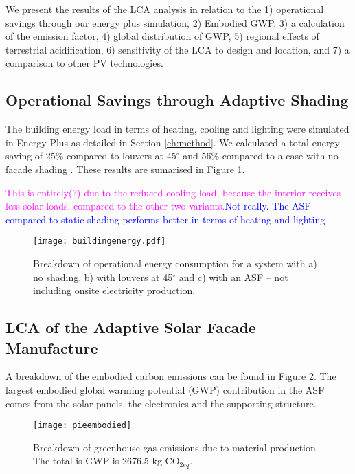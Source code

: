 
We present the results of the LCA analysis in relation to the 1) operational savings through our energy plus simulation, 2) Embodied GWP, 3) a calculation of the emission factor, 4) global distribution of GWP, 5) regional effects of terrestrial acidification, 6) sensitivity of the LCA to design and location, and 7) a comparison to other PV technologies.

\subsection{Operational Savings through Adaptive Shading}
\label{ch:oppResults}

The building energy load in terms of heating, cooling and lighting were simulated in Energy Plus as detailed in Section \ref{ch:method}. We calculated a total energy saving of 25\% compared to louvers at 45$^\circ$ and 56\% compared to a case with no facade shading \cite{jayathissa2015abs}. These results are sumarised in Figure \ref{fig:operational}. 

\textcolor{magenta}{This is entirely(?) due to the reduced cooling load, because the interior receives less solar loads, compared to the other two variants.}\textcolor{blue}{Not really. The ASF compared to static shading performs better in terms of heating and lighting}

\begin{figure}[H]
\begin{center}
\texttt{[image: buildingenergy.pdf]}
\caption{Breakdown of operational energy consumption for a system with a) no shading, b) with louvers at 45$^\circ$ and c) with an ASF -- not including onsite electricity production.}
\label{fig:operational}
\end{center}
\end{figure}

\subsection{LCA of the Adaptive Solar Facade Manufacture}

A breakdown of the embodied carbon emissions can be found in Figure  \ref{fig:embodied}. The largest embodied global warming potential (GWP) contribution in the ASF comes from the solar panels, the electronics and the supporting structure.

\begin{figure}[H]
\begin{center}
\texttt{[image: pieembodied]}
\caption{Breakdown of greenhouse gas emissions due to material production. The total is GWP is 2676.5 kg CO$_{2eq}$.}
\label{fig:embodied}
\end{center}
\end{figure}

